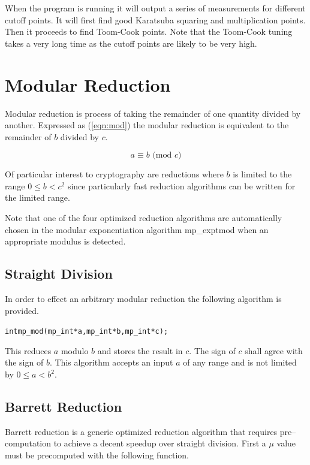 \documentclass[synpaper]{book}
\begin{document}
When the program is running it will output a series of measurements for different cutoff points.  It will first find
good Karatsuba squaring and multiplication points.  Then it proceeds to find Toom-Cook points.  Note that the Toom-Cook
tuning takes a very long time as the cutoff points are likely to be very high.

\chapter{Modular Reduction}

Modular reduction is process of taking the remainder of one quantity divided by another.  Expressed 
as (\ref{eqn:mod}) the modular reduction is equivalent to the remainder of $b$ divided by $c$.  

\begin{equation}
a \equiv b \mbox{ (mod }c\mbox{)}
\label{eqn:mod}
\end{equation}

Of particular interest to cryptography are reductions where $b$ is limited to the range $0 \le b < c^2$ since particularly 
fast reduction algorithms can be written for the limited range.  

Note that one of the four optimized reduction algorithms are automatically chosen in the modular exponentiation
algorithm mp\_exptmod when an appropriate modulus is detected.  

\section{Straight Division}
In order to effect an arbitrary modular reduction the following algorithm is provided.

\begin{alltt}
int mp_mod(mp_int *a, mp_int *b, mp_int *c);
\end{alltt}

This reduces $a$ modulo $b$ and stores the result in $c$.  The sign of $c$ shall agree with the sign 
of $b$.  This algorithm accepts an input $a$ of any range and is not limited by $0 \le a < b^2$.

\section{Barrett Reduction}

Barrett reduction is a generic optimized reduction algorithm that requires pre--computation to achieve
a decent speedup over straight division.  First a $\mu$ value must be precomputed with the following function.
\end{document}
